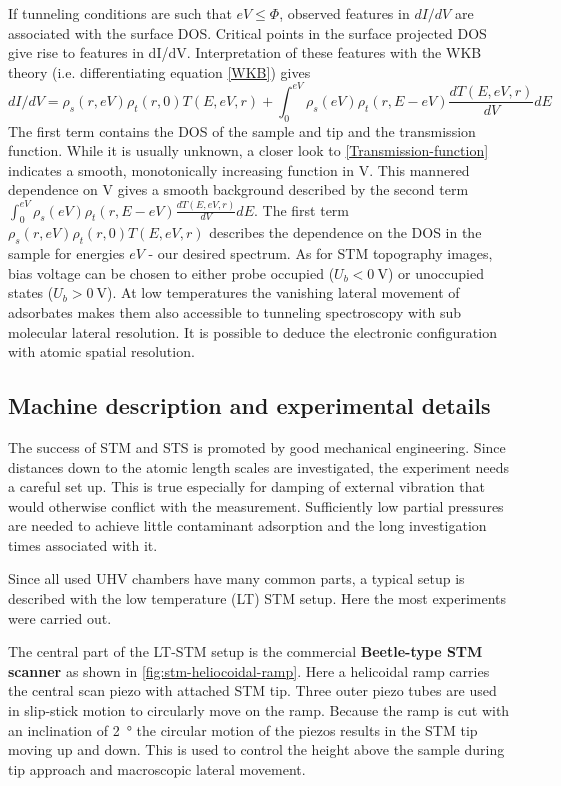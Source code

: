 If tunneling conditions are such that $eV\leq\Phi$, observed features in $dI/dV$ are associated with the surface DOS. Critical points in the surface projected DOS give rise to features in dI/dV. Interpretation of these features with the WKB theory (i.e. differentiating equation \eqref{WKB}) gives
$$dI/dV=\rho_s(r,eV)\rho_t(r,0)T(E,eV,r)+\int_0^{eV}\rho_s(eV)\rho_t(r,E-eV)\frac{dT(E,eV,r)}{dV}dE$$
The first term contains the DOS of the sample and tip and the transmission function. While it is usually unknown, a closer look to \eqref{Transmission-function} indicates a smooth, monotonically increasing function in V. This mannered dependence on V gives a smooth background described by the second term $\int_0^{eV}\rho_s(eV)\rho_t(r,E-eV)\frac{dT(E,eV,r)}{dV}dE$.
The first term $\rho_s(r,eV)\rho_t(r,0)T(E,eV,r)$ describes the dependence on the DOS in the sample for energies $eV$ - our desired spectrum. As for STM topography images, bias voltage can be chosen to either probe occupied ($U_b < \SI{0}{\volt}$) or unoccupied states ($U_b > \SI{0}{\volt}$).  At low temperatures the vanishing lateral movement of adsorbates makes them also accessible to tunneling spectroscopy with sub molecular lateral resolution. It is possible to deduce the electronic configuration with atomic spatial resolution.

\subsection{Machine description and experimental details}
The success of STM and STS is promoted by good mechanical engineering. Since distances down to the atomic length scales are investigated, the experiment needs a careful set up. This is true especially for damping of external vibration that would otherwise conflict with the measurement. Sufficiently low partial pressures are needed to achieve little contaminant adsorption and the long investigation times associated with it.

Since all used UHV chambers have many common parts, a typical setup is described with the low temperature (LT) STM setup. Here the most experiments were carried out.

The central part of the LT-STM setup is the commercial \textbf{Beetle-type STM scanner} \cite{zoephel_aufbau_2000} as shown in \autoref{fig:stm-heliocoidal-ramp}. Here a helicoidal ramp carries the central scan piezo with attached STM tip. Three outer piezo tubes are used in slip-stick motion to circularly move on the ramp. Because the ramp is cut with an inclination of \SI{2}{\degree} the circular motion of the piezos results in the STM tip moving up and down. This is used to control the height above the sample during tip approach and macroscopic lateral movement.

